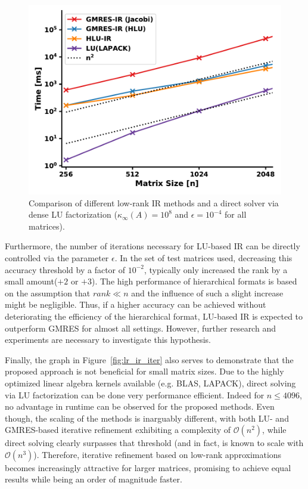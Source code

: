 \begin{figure}[h]
    \centering
    \includegraphics[width=0.7\linewidth]{chapters/5_experiments/figures/LR_scaling.pdf}
    \caption[Low-Rank IR - Runtime]{Comparison of different low-rank IR methods and a direct solver via dense LU factorization ($\kappa_\infty(A)=10^8$ and $\epsilon = 10^{-4}$ for all matrices).}
    \label{fig:lr_ir_scaling}
\end{figure}

Furthermore, the number of iterations necessary for LU-based IR can be directly controlled via the parameter $\epsilon$. In the set of test matrices used, decreasing this accuracy threshold by a factor of $10^{-2}$, typically only increased the rank by a small amount($+2$ or $+3$). The high performance of hierarchical formats is based on the assumption that $rank \ll n$ and the influence of such a slight increase might be negligible. Thus, if a higher accuracy can be achieved without deteriorating the efficiency of the hierarchical format, LU-based IR is expected to outperform GMRES for almost all settings. However, further research and experiments are necessary to investigate this hypothesis.

Finally, the graph in Figure~\hyperref[fig:lr_ir_iter]{\ref{fig:lr_ir_iter}} also serves to demonstrate that the proposed approach is not beneficial for small matrix sizes. Due to the highly optimized linear algebra kernels available (e.g. BLAS, LAPACK), direct solving via LU factorization can be done very performance efficient. Indeed for $n \leq 4096$, no advantage in runtime can be observed for the proposed methods. Even though, the scaling of the methods is inarguably different, with both LU- and GMRES-based iterative refinement exhibiting a complexity of $\mathcal{O}(n^2)$, while direct solving clearly surpasses that threshold (and in fact, is known to scale with $\mathcal{O}(n^3)$). Therefore, iterative refinement based on low-rank approximations becomes increasingly attractive for larger matrices, promising to achieve equal results while being an order of magnitude faster.



